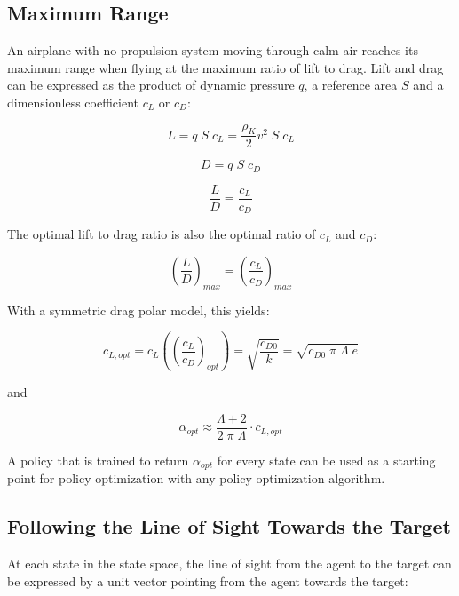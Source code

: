 \subsection{Maximum Range}

An airplane with no propulsion system moving through calm air reaches its maximum range when flying at the maximum ratio of lift to drag. Lift and drag can be expressed as the product of dynamic pressure $q$, a reference area $S$ and a dimensionless coefficient $c_L$ or $c_D$:

\begin{equation}
L = q \; S \; c_L = \frac{\rho_K}{2} v^2 \; S \; c_L
\end{equation}  

\begin{equation}
D = q \; S \; c_D
\end{equation}

\begin{equation}
\frac{L}{D} = \frac{c_L}{c_D}
\end{equation}

The optimal lift to drag ratio is also the optimal ratio of $c_L$ and $c_D$:

\begin{equation}
\left(\frac{L}{D}\right)_{max} = \left(\frac{c_L}{c_D}\right)_{max}
\end{equation}

With a symmetric drag polar model, this yields:

\begin{equation}
c_{L,opt}=c_L\left(\left(\frac{c_L}{c_D}\right)_{opt}\right) = \sqrt{\frac{c_{D0}}{k}}=\sqrt{c_{D0}\;\pi\;\Lambda\;e}
\end{equation}

and

\begin{equation}
\alpha_{opt} \approx \frac{\Lambda+2}{2\;\pi\;\Lambda}\cdot c_{L,opt}
\end{equation}

A policy that is trained to return $\alpha_{opt}$ for every state can be used as a starting point for policy optimization with any policy optimization algorithm.

\subsection{Following the Line of Sight Towards the Target}

At each state in the state space, the line of sight from the agent to the target can be expressed by a unit vector pointing from the agent towards the target:

